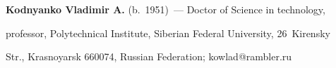 \Contrl





\noindent


\textbf{Kodnyanko Vladimir A.} (b.\ 1951)~--- Doctor of Science in technology, 


professor, Polytechnical Institute, Siberian Federal University, 26~Kirensky 


Str., Krasnoyarsk 660074, Russian Federation; \mbox{kowlad@rambler.ru}





     


\label{end\stat}








\renewcommand{\bibname}{\protect\rm Литература}


